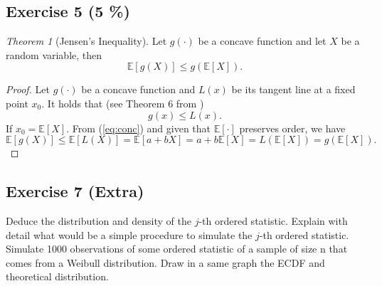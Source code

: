 \documentclass[11pt]{article}
\theoremstyle{definition}
\theoremstyle{remark}
\theoremstyle{remark}
\newtheorem{theorem}{Theorem}[section]
\newcommand{\E}[1]{\mathbb{E}\left[#1 \right]}
\begin{document}
\subsection*{Exercise 5 (5 \%)}
\begin{theorem}[Jensen's Inequality]
  Let $g(\cdot)$ be a concave function and let $X$ be a random
  variable, then
\[
  \E{g(X)} \leq g(\E{X}).
\]
\end{theorem}

\begin{proof}
  Let $g(\cdot)$ be a concave function and $L(x)$ be its tangent line
  at a fixed point $x_0$. It holds that (see Theorem 6 from
  \cite{nachbar2018concave})
\begin{equation}\label{eq:conc}
  g(x) \leq L(x).
\end{equation}
If $x_0=\E{X}$. From (\ref{eq:conc}) and given that $\E{\cdot}$
preserves order, we have
\[
  \E{g(X)} \leq \E{L(X)} = \E{a+bX} = a + b\E{X} = L(\E{X}) =
  g(\E{X}).
\]
\end{proof}

\subsection*{Exercise 7 (Extra)}
\label{subsec:7}
Deduce the distribution and density of the $j$-th ordered
statistic. Explain with detail what would be a simple procedure to
simulate the $j$-th ordered statistic. Simulate 1000 observations of
some ordered statistic of a sample of size n that comes from a Weibull
distribution. Draw in a same graph the ECDF and theoretical
distribution.
\end{document}
